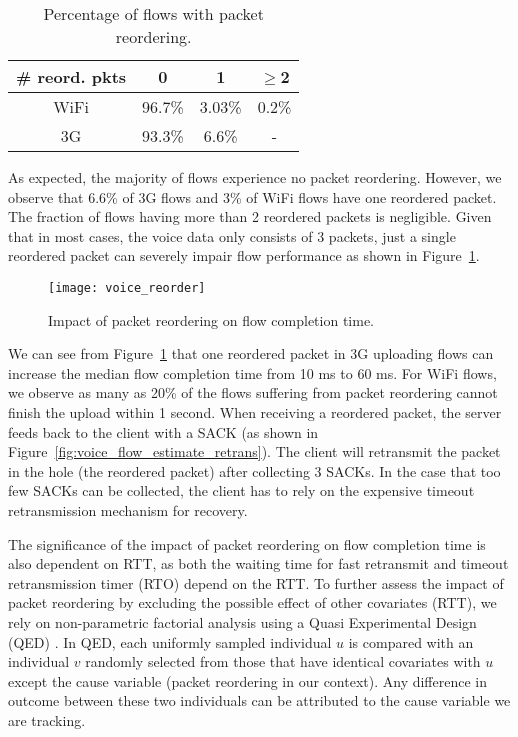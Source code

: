 \begin{table}[th]
\caption{Percentage of flows with packet reordering.}
\label{tab:voice_reorder}
\centering
\renewcommand{\arraystretch}{1.0}
\begin{tabular}{c|c|c|c}
	\hline
	\# reord. pkts & 0 & 1 & $\ge$2 \\
	\hline
	WiFi & 96.7\% & 3.03\% & 0.2\% \\
	\hline
	3G & 93.3\% & 6.6\% & - \\
	\hline
\end{tabular}
\minsqueeze
\end{table}

As expected, the majority of flows experience no packet reordering. However, we observe that 6.6\% of 3G flows and 3\% of WiFi flows have one reordered packet. The fraction of flows having more than 2 reordered packets is negligible. Given that in most cases, the voice data only consists of 3 packets, just a single reordered packet can severely impair flow performance as shown in Figure~\ref{fig:voice_reorder}.

\begin{figure}[th]
\centering
	\texttt{[image: voice\_reorder]}
\caption{Impact of packet reordering on flow completion time.}
\label{fig:voice_reorder}
\minsqueeze
\end{figure}

We can see from Figure~\ref{fig:voice_reorder} that one reordered packet in 3G uploading flows can increase the median flow completion time from 10 ms to 60 ms. For WiFi flows, we observe as many as 20\% of the flows suffering from packet reordering cannot finish the upload within 1 second. When receiving a reordered packet, the server feeds back to the client with a SACK (as shown in Figure~\ref{fig:voice_flow_estimate_retrans}). The client will retransmit the packet in the hole (\ie the reordered packet) after collecting 3 SACKs. In the case that too few SACKs can be collected, the client has to rely on the expensive timeout retransmission mechanism for recovery. %

The significance of the impact of packet reordering on flow completion time is also dependent on RTT, as both the waiting time for fast retransmit and timeout retransmission timer (\ie RTO) depend on the RTT. To further assess the impact of packet reordering by excluding the possible effect of other covariates (\eg RTT), we rely on non-parametric factorial analysis using a Quasi Experimental Design (QED) \cite{krishnan2013video}. In QED, each uniformly sampled individual $u$ is compared with an individual $v$ randomly selected from those that have identical covariates with $u$ except the cause variable (packet reordering in our context). Any difference in outcome between these two individuals can be attributed to the cause variable we are tracking.

